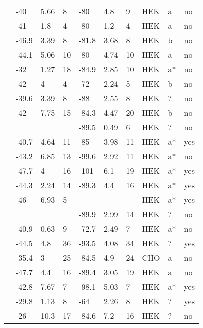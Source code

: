 \begin{longtable}{p{6cm}|lll|lll|lll}
\citet{Tan2005MutationDB} & -40 & 5.66 & 8 & -80 & 4.8 & 9 & HEK & a & no \\
\citet{Tan2005MutationDB} & -41 & 1.8 & 4 & -80 & 1.2 & 4 & HEK & a & no \\
\citet{Tan2006MutationDB} & -46.9 & 3.39 & 8 & -81.8 & 3.68 & 8 & HEK & b & no \\
\citet{Tan2006MutationDB} & -44.1 & 5.06 & 10 & -80 & 4.74 & 10 & HEK & a & no \\
\citet{Tarradas2013MutationDB} & -32 & 1.27 & 18 & -84.9 & 2.85 & 10 & HEK & a* & no \\
\citet{Tester2010MutationDB} & -42 & 4 & 4 & -72 & 2.24 & 5 & HEK & b & no \\
\citet{Tsurugi2009MutationDB} & -39.6 & 3.39 & 8 & -88 & 2.55 & 8 & HEK & ? & no \\
\citet{Valdivia2004MutationDB} & -42 & 7.75 & 15 & -84.3 & 4.47 & 20 & HEK & b & no \\
\citet{Vatta2002aMutationDB} & && & -89.5 & 0.49 & 6 & HEK & ? & no \\
\citet{Viswanathan2003MutationDB} & -40.7 & 4.64 & 11 & -85 & 3.98 & 11 & HEK & a* & yes \\
\citet{Wang1996MutationDB} & -43.2 & 6.85 & 13 & -99.6 & 2.92 & 11 & HEK & a* & no \\
\citet{Wang2002MutationDB} & -47.7 & 4 & 16 & -101 & 6.1 & 19 & HEK & a* & yes \\
\citet{Wang2007aMutationDB} & -44.3 & 2.24 & 14 & -89.3 & 4.4 & 16 & HEK & a* & yes \\
\citet{Wang2007bMutationDB} & -46 & 6.93 & 5 & && & HEK & a* & yes \\
\citet{Wang2011MutationDB} & && & -89.9 & 2.99 & 14 & HEK & ? & no \\
\citet{Wang2015MutationDB} & -40.9 & 0.63 & 9 & -72.7 & 2.49 & 7 & HEK & a* & no \\
\citet{Wang2016MutationDB} & -44.5 & 4.8 & 36 & -93.5 & 4.08 & 34 & HEK & ? & yes \\
\citet{Watanabe2011bMutationDB} & -35.4 & 3 & 25 & -84.5 & 4.9 & 24 & CHO & a & no \\
\citet{Watanabe2011bMutationDB} & -47.7 & 4.4 & 16 & -89.4 & 3.05 & 19 & HEK & a & no \\
\citet{Wedekind2001MutationDB} & -42.8 & 7.67 & 7 & -98.1 & 5.03 & 7 & HEK & a* & yes \\
\citet{Wehrens2003MutationDB} & -29.8 & 1.13 & 8 & -64 & 2.26 & 8 & HEK & ? & yes \\
\citet{Winkel2012MutationDB} & -26 & 10.3 & 17 & -84.6 & 7.2 & 16 & HEK & ? & no \\

\end{longtable}
